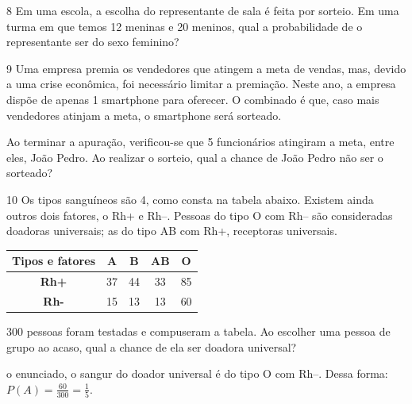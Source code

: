 {{{\begin{escolha}
{{{{{\begin{escolha}
\begin{escolha}
{\begin{q°}
{\begin{enumerate}
{{\num{8} Em uma escola, a escolha do representante de sala é feita por sorteio.
Em uma turma em que temos 12 meninas e 20 meninos, qual a probabilidade
de o representante ser do sexo feminino?



\num{9} Uma empresa premia os vendedores que atingem a meta de
vendas, mas, devido a uma crise econômica, foi necessário limitar a 
premiação. Neste ano, a empresa dispõe de apenas 1 smartphone para 
oferecer. O combinado é que, caso mais vendedores atinjam 
a meta, o smartphone será sorteado.

Ao terminar a apuração, verificou-se que 5 funcionários atingiram a
meta, entre eles, João Pedro. Ao realizar o sorteio, qual a chance de
João Pedro não ser o sorteado?



\num{10} Os tipos sanguíneos são 4, como consta na tabela abaixo. Existem ainda
outros dois fatores, o Rh+ e Rh--. Pessoas do tipo O com Rh-- são consideradas 
doadoras universais; as do tipo AB com Rh+, receptoras universais.

\begin{table}[]
\begin{tabular}{|c|c|c|c|c|}
\hline
\rowcolor[HTML]{FFCCC9} 
\textbf{Tipos e fatores} & \textbf{A} & \textbf{B} & \textbf{AB} & \textbf{O} \\ \hline
\cellcolor[HTML]{FFCCC9}\textbf{Rh+} & 37 & 44 & 33 & 85 \\ \hline
\cellcolor[HTML]{FFCCC9}\textbf{Rh-} & 15 & 13 & 13 & 60 \\ \hline
\end{tabular}
\end{table}

300 pessoas foram testadas e compuseram a tabela. Ao escolher uma pessoa
de grupo ao acaso, qual a chance de ela ser doadora universal?

o enunciado, o sangur do doador universal é do tipo O com Rh--. 
Dessa forma: $P(A) = \frac{60}{300} = \frac{1}{5}$.}

}
\end{enumerate}}
\end{q°}}
\end{escolha}
\end{escolha}}}}}}
\end{escolha}}}}
